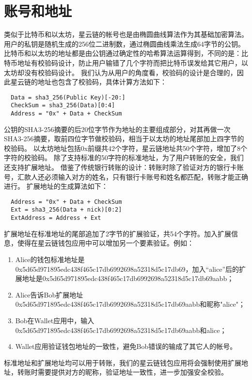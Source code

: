 \section{账号和地址}

类似于比特币和以太坊，星云链的帐号也是由椭圆曲线算法作为其基础加密算法。
用户的私钥是随机生成的256位二进制数，通过椭圆曲线乘法生成64字节的公钥。
比特币和以太坊的地址都是由公钥通过确定性的哈希算法运算得到，不同的是：比特币地址有校验码设计，防止用户输错了几个字符而把比特币误发给其它用户，以太坊却没有校验码设计。
我们认为从用户的角度看，校验码的设计是合理的，因此星云链的地址也包含了校验码，具体计算方法如下：

\begin{verbatim}
  Data = sha3_256(Public Key)[-20:]
  CheckSum = sha3_256(Data)[0:4]
  Address = "0x" + Data + CheckSum
\end{verbatim}

公钥的SHA3-256摘要的后20位字节作为地址的主要组成部分，对其再做一次SHA3-256摘要，取前四位字节做校验码，相当于以太坊的地址尾部加上四字节的校验码。
以太坊地址包括0x前缀共42个字符，星云链地址共50个字符，增加了8个字符的校验码。
	除了支持标准的50字符的标准地址，为了用户转账的安全，我们还支持扩展地址。
	借鉴了传统银行转账的设计：转账时除了验证对方的银行卡账号，汇款人还必须输入对方的姓名，只有银行卡账号和姓名都匹配，转账才能正确进行。
	扩展地址的生成算法如下：

\begin{verbatim}
  Address = "0x" + Data + CheckSum
  Ext = sha3_256(Data + nick)[0:2]
  ExtAddress = Address + Ext
\end{verbatim}

扩展地址在标准地址的尾部追加了2字节的扩展验证，共54个字符。加入扩展信息，使得在星云链钱包应用中可以增加另一个要素验证。例如：
\begin{enumerate}
	\item Alice的钱包标准地址是0x5d65d971895edc438f465c17db6992698a52318d5c17db69，加入“alice”后的扩展地址是0x5d65d971895edc438f465c17db6992698a52318d5c17db69aabb；
	\item Alice告诉Bob扩展地址 0x5d65d971895edc438f465c17db6992698a52318d5c17db69aabb和昵称"alice"；
	\item Bob在Wallet应用中，输入 0x5d65d971895edc438f465c17db6992698a52318d5c17db69aabb和alice；
	\item Wallet应用验证钱包地址的一致性，避免Bob错误的输成了其它人的帐号。
\end{enumerate}
		
	标准地址和扩展地址均可以用于转账，我们的星云链钱包应用将会强制使用扩展地址，转账时需要提供对方的昵称，验证地址一致性，进一步加强安全校验。
